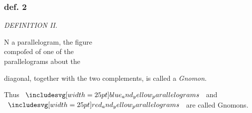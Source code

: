 \documentclass[11pt,preview]{standalone}
\begin{document}
\subsubsection{def. 2}

\begin{minipage}[t]{0.54\textwidth}
    \begin{center}
        \textit{DEFINITION II.}\label{book2def2} \\
    \end{center}

    \hfill

    \begin{center}
        \raggedright \lettrine[lines=3, loversize=1, nindent=0pt]{}{}N a parallelogram, the figure\\ compoſed of one of the\\ parallelograms about the
    \end{center}
    \raggedright diagonal, together with the two complements, is called a \textit{Gnomon}.
\end{minipage}%
\hfill
\begin{minipage}[t]{0.43\textwidth}
    \vspace{18pt}
    
\end{minipage}%

\hfill

\hfill

\hfill

\begin{center}
    Thus $\img{blue_and_yellow_parallelograms}$ and $\img{red_and_yellow_parallelograms}$ are called Gnomons.
\end{center}
\end{document}
